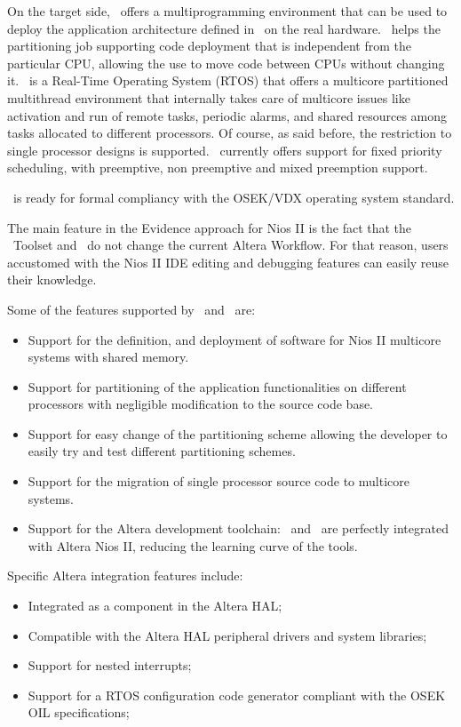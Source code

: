 On the target side, \ee\ offers a multiprogramming environment that
can be used to deploy the application architecture defined in \rtd\ on
the real hardware. \ee\ helps the partitioning job supporting code
deployment that is independent from the particular CPU, allowing the
use to move code between CPUs without changing it. \ee\ is a Real-Time
Operating System (RTOS) that offers a multicore partitioned
multithread environment that internally takes care of multicore issues
like activation and run of remote tasks, periodic alarms, and shared
resources among tasks allocated to different processors. Of course, as
said before, the restriction to single processor designs is
supported. \ee\ currently offers support for fixed priority
scheduling, with preemptive, non preemptive and mixed preemption
support.

\ee\ is ready for formal compliancy with the OSEK/VDX
operating system standard.

The main feature in the Evidence approach for Nios II is the fact that
the \rtd\ Toolset and \ee\ do not change the current Altera
Workflow. For that reason, users accustomed with the Nios II IDE
editing and debugging features can easily reuse their knowledge.

Some of the features supported by \rtd\ and \ee\ are:

\begin{itemize}
\item Support for the definition, and deployment of software for
      Nios II multicore systems with shared memory.
\item Support for partitioning of the application functionalities on
      different processors with negligible modification to the source
      code base.
\item Support for easy change of the partitioning scheme allowing the
      developer to easily try and test different partitioning schemes.
\item Support for the migration of single processor source code
      to multicore systems.
\item Support for the Altera development toolchain: \rtd\ and \ee\ are
      perfectly integrated with Altera Nios II, reducing the learning
      curve of the tools.
\end{itemize}

Specific Altera integration features include:
\begin{itemize}
\item Integrated as a component in the Altera HAL;
\item Compatible with the Altera HAL peripheral drivers and system
libraries;
\item Support for nested interrupts;
\item Support for a RTOS configuration code generator compliant
with the OSEK OIL specifications;
\end{itemize}

